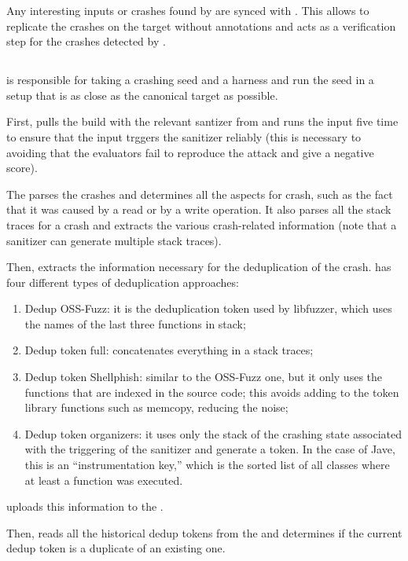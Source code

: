 Any interesting inputs or crashes found by \aijon are synced with \afluzzer.
This allows \afluzzer to replicate the crashes on the target without annotations and acts as a verification step for the crashes detected by \aijon.

\subsection{\povguy}

\povguy is responsible for taking a crashing seed and a harness and run the seed in a setup that is as close as the canonical target as possible.

First, \povguy pulls the build with the relevant santizer from \builder and runs the input five time to ensure that the input trggers the sanitizer reliably (this is necessary to avoiding that the evaluators fail to reproduce the attack and give a negative score).

The \povguy parses the crashes and determines all the aspects for crash, such as the fact that it was caused by a read or by a write operation.
It also parses all the stack traces for a crash and extracts the various crash-related information (note that a sanitizer can generate multiple stack traces).

Then, \povguy extracts the information necessary for the deduplication of the crash.
\povguy has four different types of deduplication approaches:
\begin{enumerate}
\item Dedup OSS-Fuzz: it is the deduplication token used by libfuzzer, which uses the names of the last three functions in stack;
\item Dedup token full: concatenates everything in a stack traces;
\item Dedup token Shellphish: similar to the OSS-Fuzz one, but it only uses the functions that are indexed in the source code; this avoids adding to the token library functions such as memcopy, reducing the noise;
\item Dedup token organizers: it uses only the stack of the crashing state associated with the triggering of the sanitizer and generate a token. In the case of Jave, this is an ``instrumentation key,'' which is the sorted list of all classes where at least a function was executed.
\end{enumerate}

\povguy uploads this information to the \analysisgraph.

Then, \povguy reads all the historical dedup tokens from the \analysisgraph  and determines if the current dedup token is a duplicate of an existing one.

